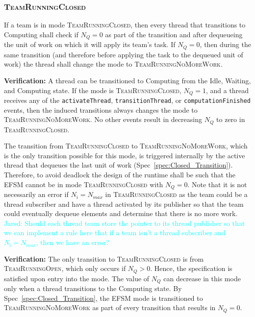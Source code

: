 \documentclass{article}
\newcommand{\TeamRunningOpen}   {\textsc{TeamRunningOpen}}
\newcommand{\TeamRunningClosed} {\textsc{TeamRunningClosed}}
\newcommand{\TeamRunningNoMoreWork} {\textsc{TeamRunningNoMoreWork}}
\newcommand{\Jared}[1]          {\textcolor{cyan}{Jared: #1}}
\begin{document}
\subsubsection{\TeamRunningClosed}
\begin{spec}
\label{spec:Closed_Transition}
If a team is in mode \TeamRunningClosed, then every thread that transitions to
Computing shall check if $N_Q = 0$ as part of the transition and after
dequeueing the unit of work on which it will apply its team's task.  If $N_Q =
0$, then during the same transition (and therefore before applying the task to
the dequeued unit of work) the thread shall change the mode to
\TeamRunningNoMoreWork.
\end{spec}
\textbf{Verification:}\hspace{0.125in}  A thread can be transitioned to
Computing from the Idle, Waiting, and Computing state.  If the mode is
{\TeamRunningClosed}, $N_Q = 1$, and a
thread receives any of the \texttt{activateThread}, \texttt{transitionThread},
or \texttt{computationFinished} events, then the induced transitions always changes
the mode to \TeamRunningNoMoreWork.  No other events result in decreasing $N_Q$
to zero in \TeamRunningClosed.

\begin{spec}
\label{spec:Closed_NoWork}
The transition from {\TeamRunningClosed} to \TeamRunningNoMoreWork, which is the
only transition possible for this mode, is triggered internally by the active
thread that dequeues the last unit of work (Spec~\ref{spec:Closed_Transition}).
Therefore, to avoid deadlock the design of the runtime shall be such that the
EFSM cannot be in mode {\TeamRunningClosed} with $N_Q = 0$.  Note that it is not
necessarily an error if $N_i = N_{max}$ in {\TeamRunningClosed} as the team
could be a thread subscriber and have a thread activated by its publisher so
that the team could eventually dequeue elements and determine that there is no
more work.
\Jared{Should each thread team store the pointer to its thread
publisher so that we can implement a rule here that if a team isn't a thread
subscriber and $N_i = N_{max}$, then we have an error?}
\end{spec}
\textbf{Verification:}\hspace{0.125in}  The only transition to
{\TeamRunningClosed} is from {\TeamRunningOpen}, which only occurs if $N_Q > 0$.
Hence, the specification is satisfied upon entry into the mode.  The value of
$N_Q$ can decrease in this mode only when a thread transitions to the Computing
state.   By Spec~\ref{spec:Closed_Transition}, the EFSM mode is transitioned to
{\TeamRunningNoMoreWork} as part of every transition that results in $N_Q = 0$.
\end{document}
